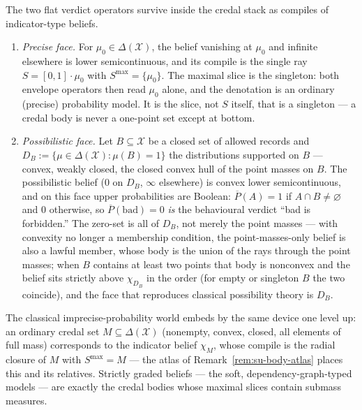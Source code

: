 \begin{remark}
\label{rem:su-faces}
The two flat verdict operators survive inside the credal stack as
compiles of indicator-type beliefs.
\begin{enumerate}
\item \emph{Precise face.} For $\mu_0 \in \Delta(\mathcal{X})$, the
  belief vanishing at $\mu_0$ and infinite elsewhere is lower
  semicontinuous, and its compile is the single ray
  $S = [0,1] \cdot \mu_0$ with $S^{\max} = \{\mu_0\}$. The maximal
  slice is the singleton: both envelope operators then read $\mu_0$
  alone, and the denotation is an ordinary (precise) probability
  model. It is the slice, not $S$ itself, that is a singleton --- a
  credal body is never a one-point set except at bottom.
\item \emph{Possibilistic face.} Let $B \subseteq \mathcal{X}$ be a
  closed set of allowed records and
  $D_B := \{\mu \in \Delta(\mathcal{X}) : \mu(B) = 1\}$ the
  distributions supported on $B$ --- convex, weakly closed, the
  closed convex hull of the point masses on $B$. The possibilistic
  belief ($0$ on $D_B$, $\infty$ elsewhere) is convex lower
  semicontinuous, and on this face upper
  probabilities are Boolean:
  $\overline{P}(A) = 1$ if $A \cap B \neq \varnothing$ and $0$
  otherwise, so $\overline{P}(\mathrm{bad}) = 0$ \emph{is} the
  behavioural verdict ``bad is forbidden.'' The zero-set is all
  of $D_B$, not merely the point masses --- with convexity no
  longer a membership condition, the point-masses-only belief is
  also a lawful member, whose body is the union of the
  rays through the point masses; when $B$ contains at least two
  points that body is nonconvex and the belief sits strictly above
  $\chi_{D_B}$ in the order (for empty or singleton $B$ the two
  coincide), and the face that reproduces classical
  possibility theory is $D_B$.
\end{enumerate}
The classical imprecise-probability world embeds by the same device
one level up: an ordinary credal set $M \subseteq \Delta(\mathcal{X})$
(nonempty, convex, closed, all elements of full mass) corresponds to
the indicator belief $\chi_M$, whose compile is the radial closure
of $M$ with $S^{\max} = M$ --- the atlas of
Remark~\ref{rem:su-body-atlas} places this and its relatives.
Strictly graded beliefs --- the soft,
dependency-graph-typed models --- are exactly the credal bodies
whose maximal slices contain submass measures.
\end{remark}

